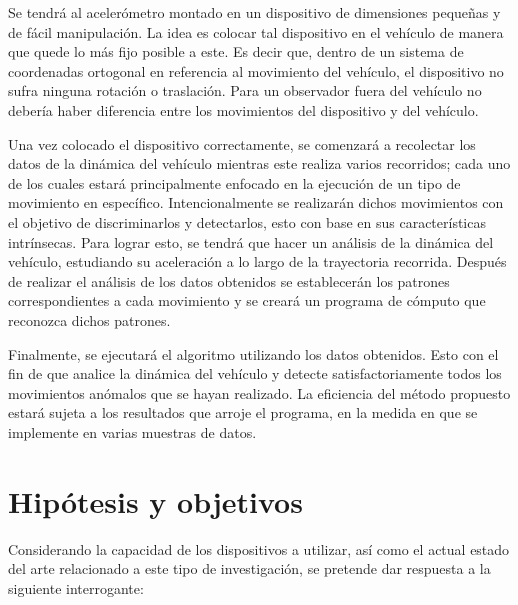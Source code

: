 Se tendrá al acelerómetro montado en un dispositivo de dimensiones pequeñas y de fácil manipulación. 
La idea es colocar tal dispositivo en el vehículo de manera que quede lo más fijo posible a este.
Es decir que, dentro de un sistema de coordenadas ortogonal en referencia al movimiento del vehículo, el dispositivo no sufra ninguna rotación o traslación. 
Para un observador fuera del vehículo no debería haber diferencia entre los movimientos del dispositivo y del vehículo.
 
Una vez colocado el dispositivo correctamente, se comenzará a recolectar los datos de la dinámica del vehículo mientras este realiza varios recorridos; cada uno de los cuales estará principalmente enfocado en la ejecución de un tipo de movimiento en específico. 
Intencionalmente se realizarán dichos movimientos con el objetivo de discriminarlos y detectarlos, esto con base en sus características intrínsecas. 
Para lograr esto, se tendrá que hacer un análisis de la dinámica del vehículo, estudiando su aceleración a lo largo de la trayectoria recorrida. 
Después de realizar el análisis de los datos obtenidos se establecerán los patrones correspondientes a cada movimiento y se creará un programa de cómputo que reconozca dichos patrones.

Finalmente, se ejecutará el algoritmo utilizando los datos obtenidos. 
Esto con el fin de que analice la dinámica del vehículo y detecte satisfactoriamente todos los movimientos anómalos que se hayan realizado.
La eficiencia del método propuesto estará sujeta a los resultados que arroje el programa, en la medida en que se implemente en varias muestras de datos.



\section{Hipótesis y objetivos} 
Considerando la capacidad de los dispositivos a utilizar, así como el actual estado del arte relacionado a este tipo de investigación, se pretende dar respuesta a la siguiente interrogante:\\

